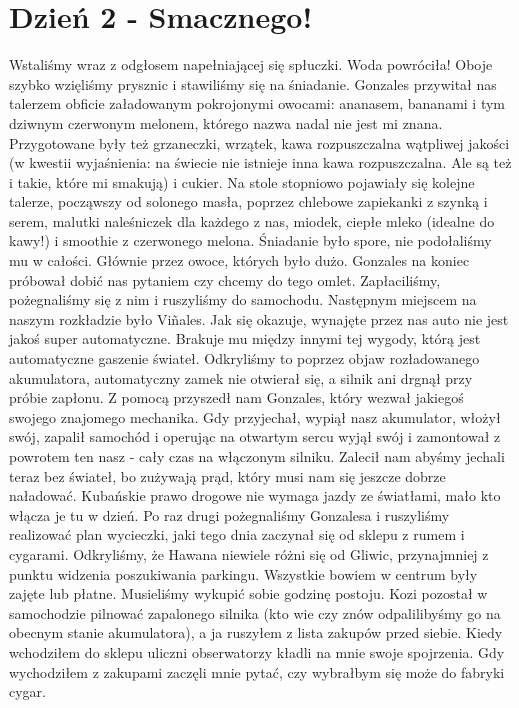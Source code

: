 
\chapter[Smacznego!]{Dzień 2 - Smacznego!}

Wstaliśmy wraz z odgłosem napełniającej się spłuczki.
Woda powróciła!
Oboje szybko wzięliśmy prysznic i stawiliśmy się na śniadanie.
Gonzales przywitał nas talerzem obficie załadowanym pokrojonymi owocami: ananasem, bananami i tym dziwnym czerwonym melonem, którego nazwa nadal nie jest mi znana.
Przygotowane były też grzaneczki, wrzątek, kawa rozpuszczalna wątpliwej jakości (w kwestii wyjaśnienia: na świecie nie istnieje inna kawa rozpuszczalna.
Ale są też i takie, które mi smakują) i cukier.
Na stole stopniowo pojawiały się kolejne talerze, począwszy od solonego masła, poprzez chlebowe zapiekanki z szynką i serem, malutki naleśniczek dla każdego z nas, miodek, ciepłe mleko (idealne do kawy!) i smoothie z czerwonego melona.
Śniadanie było spore, nie podołaliśmy mu w całości. Głównie przez owoce, których było dużo.
Gonzales na koniec próbował dobić nas pytaniem czy chcemy do tego omlet.
Zapłaciliśmy, pożegnaliśmy się z nim i ruszyliśmy do samochodu.
Następnym miejscem na naszym rozkładzie było Viñales.
Jak się okazuje, wynajęte przez nas auto nie jest jakoś super automatyczne.
Brakuje mu między innymi tej wygody, którą jest automatyczne gaszenie świateł.
Odkryliśmy to poprzez objaw rozładowanego akumulatora, automatyczny zamek nie otwierał się, a silnik ani drgnął przy próbie zapłonu.
Z pomocą przyszedł nam Gonzales, który wezwał jakiegoś swojego znajomego mechanika.
Gdy przyjechał, wypiął nasz akumulator, włożył swój, zapalił samochód i operując na otwartym sercu wyjął swój i zamontował z powrotem ten nasz - cały czas na włączonym silniku.
Zalecił nam abyśmy jechali teraz bez świateł, bo zużywają prąd, który musi nam się jeszcze dobrze naładować.
Kubańskie prawo drogowe nie wymaga jazdy ze światłami, mało kto włącza je tu w dzień.
Po raz drugi pożegnaliśmy Gonzalesa i ruszyliśmy realizować plan wycieczki, jaki tego dnia zaczynał się od sklepu z rumem i cygarami.
Odkryliśmy, że Hawana niewiele różni się od Gliwic, przynajmniej z punktu widzenia poszukiwania parkingu.
Wszystkie bowiem w centrum były zajęte lub płatne.
Musieliśmy wykupić sobie godzinę postoju.
Kozi pozostał w samochodzie pilnować zapalonego silnika (kto wie czy znów odpalilibyśmy go na obecnym stanie akumulatora), a ja ruszyłem z lista zakupów przed siebie.
Kiedy wchodziłem do sklepu uliczni obserwatorzy kładli na mnie swoje spojrzenia.
Gdy wychodziłem z zakupami zaczęli mnie pytać, czy wybrałbym się może do fabryki cygar.
